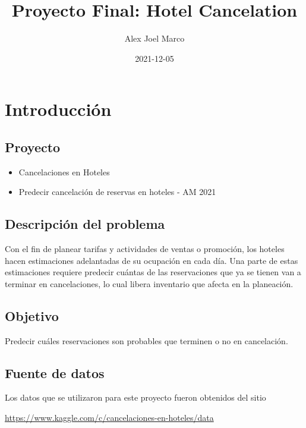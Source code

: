 \documentclass[
]{book}
\title{Proyecto Final: Hotel Cancelation}
\author{Alex Joel Marco}
\date{2021-12-05}
\providecommand{\tightlist}{%
  \setlength{\itemsep}{0pt}\setlength{\parskip}{0pt}}
\begin{document}
\maketitle

{
\setcounter{tocdepth}{1}
\tableofcontents
}
\hypertarget{introducciuxf3n}{%
\chapter{Introducción}\label{introducciuxf3n}}

\hypertarget{proyecto}{%
\section{Proyecto}\label{proyecto}}

\begin{itemize}
\tightlist
\item
  Cancelaciones en Hoteles
\item
  Predecir cancelación de reservas en hoteles - AM 2021
\end{itemize}

\hypertarget{descripciuxf3n-del-problema}{%
\section{Descripción del problema}\label{descripciuxf3n-del-problema}}

Con el fin de planear tarifas y actividades de ventas o promoción, los hoteles hacen estimaciones adelantadas de su ocupación en cada día. Una parte de estas estimaciones requiere predecir cuántas de las reservaciones que ya se tienen van a terminar en cancelaciones, lo cual libera inventario que afecta en la planeación.

\hypertarget{objetivo}{%
\section{Objetivo}\label{objetivo}}

Predecir cuáles reservaciones son probables que terminen o no en cancelación.

\hypertarget{fuente-de-datos}{%
\section{Fuente de datos}\label{fuente-de-datos}}

Los datos que se utilizaron para este proyecto fueron obtenidos del sitio

\url{https://www.kaggle.com/c/cancelaciones-en-hoteles/data}
\end{document}
